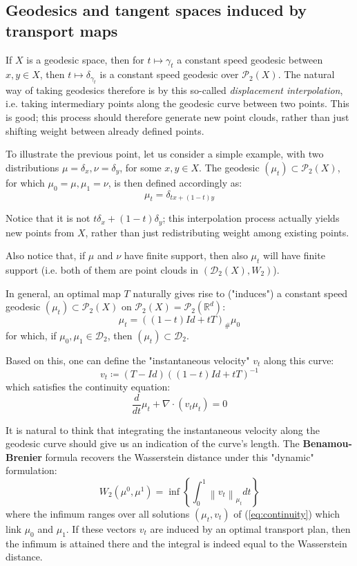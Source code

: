 \documentclass{article}
\newcommand{\norm}[1]{\left\lVert#1\right\rVert}
\begin{document}
\subsection{Geodesics and tangent spaces induced by transport maps}

If $X$ is a geodesic space, then for $t\mapsto \gamma_t$ a constant speed
geodesic between $x,y\in X$, then $t\mapsto \delta_{\gamma_t}$ is a 
constant speed geodesic over $\mathscr{P}_2(X)$. The natural way of 
taking geodesics therefore is by this so-called \textit{displacement 
interpolation}, i.e. taking intermediary points along the geodesic 
curve between two points. This is good; this process should therefore
generate new point clouds, rather than just shifting weight between
already defined points.

To illustrate the previous point, let us consider a simple example, with
two distributions $\mu = \delta_x, \nu = \delta_y$, for some $x, y\in X$. 
The geodesic $(\mu_t) \subset \mathscr{P}_2(X)$, for which $\mu_0 = \mu, 
\mu_1 = \nu$, is then defined accordingly as:
\[\mu_t = \delta_{tx + (1-t)y} \]

Notice that it is not $t\delta_x + (1-t)\delta_y$; this interpolation
process actually yields new points from $X$, rather than just 
redistributing weight among existing points.

Also notice that, if $\mu$ and $\nu$ have finite support, then also 
$\mu_t$ will have finite support (i.e. both of them are point clouds 
in $(\mathscr{D}_2(X), W_2)$).

In general, an optimal map $T$ naturally gives rise to ("induces") 
a constant speed geodesic $(\mu_t)\subset \mathscr{P}_2(X)$
on $\mathscr{P}_2(X) = \mathscr{P}_2(\mathbb{R}^d)$:
\[\mu_t = ((1-t)Id + tT)_\#\mu_0 \]
for which, if $\mu_0, \mu_1\in \mathscr{D}_2$, then $(\mu_t)\subset\mathscr{D}_2$.

Based on this, one can define the "instantaneous velocity" $v_t$ 
along this curve:
\[ v_t\coloneqq (T-Id)((1-t)Id + tT)^{-1}\]
which satisfies the continuity equation:
\begin{equation}
    \label{eq:continuity}
    \frac{d}{dt}\mu_t + \nabla \cdot (v_t\mu_t) = 0
\end{equation}

It is natural to think that integrating the instantaneous velocity along 
the geodesic curve should give us an indication of the curve's length.
The \textbf{Benamou-Brenier} formula recovers the Wasserstein distance
under this "dynamic" formulation:
\[W_2(\mu^0, \mu^1) = \inf\left\{ \int_0^1\norm{v_t}_{\mu_t}dt\right\} \]
where the infimum ranges over all solutions $(\mu_t, v_t)$ of (\ref{eq:continuity})
which link $\mu_0$ and $\mu_1$. If these vectors $v_t$ are induced by an
optimal transport plan, then the infimum is attained there and the 
integral is indeed equal to the Wasserstein distance.
\end{document}
